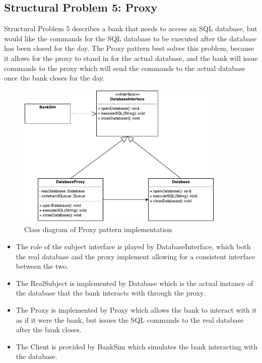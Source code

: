 \documentclass[11pt]{article}
\begin{document}
\newpage
\subsection{Structural Problem 5: Proxy}

Structural Problem 5 describes a bank that needs to access an SQL database, but
would like the commands for the SQL database to be executed after the database
has been closed for the day. The Proxy pattern best solves this problem, because
it allows for the proxy to stand in for the actual database, and the bank will 
issue commands to the proxy which will send the commands to the actual database
once the bank closes for the day.

\begin{figure}[!htb]
  \begin{center}
    \includegraphics[width=100mm]{Proxy.pdf}
    \caption{Class diagram of Proxy pattern implementation}
    \label{fig:proxy}
  \end{center} 
\end{figure}

\begin{itemize}
\item The role of the subject interface is played by 
  {\ttfamily DatabaseInterface}, which both the real database and the proxy 
  implement allowing for a consistent interface between the two. 
\item The RealSubject is implemented by {\ttfamily Database} which is the actual 
  instance of the database that the bank interacts with through the proxy.
\item The Proxy is implemented by {\ttfamily Proxy} which allows the bank to
  interact with it as if it were the bank, but issues the SQL commands to the
  real database after the bank closes.
\item The Client is provided by {\ttfamily BankSim} which simulates the bank
  interacting with the database.
\end{itemize}
\end{document}
